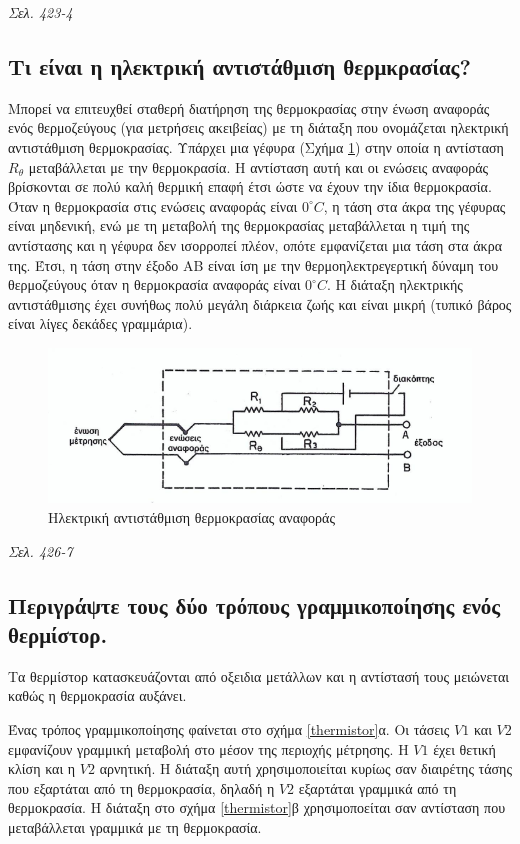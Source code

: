 \documentclass{article}
\begin{document}
\emph{Σελ. 423-4}

\subsection{Τι είναι η ηλεκτρική αντιστάθμιση θερμκρασίας?}
Μπορεί να επιτευχθεί σταθερή διατήρηση της θερμοκρασίας στην ένωση αναφοράς ενός θερμοζεύγους (για μετρήσεις ακειβείας) με τη διάταξη που ονομάζεται ηλεκτρική αντιστάθμιση
θερμοκρασίας. Υπάρχει μια γέφυρα (Σχήμα \ref{antistathmisithermokrasias}) στην οποία η αντίσταση $R_\theta$ μεταβάλλεται με την θερμοκρασία. Η αντίσταση αυτή και οι ενώσεις αναφοράς βρίσκονται σε πολύ
καλή θερμική επαφή έτσι ώστε να έχουν την ίδια θερμοκρασία. Όταν η θερμοκρασία στις ενώσεις αναφοράς είναι $0^\circ C$, η τάση στα άκρα της γέφυρας είναι μηδενική, ενώ
με τη μεταβολή της θερμοκρασίας μεταβάλλεται η τιμή της αντίστασης και η γέφυρα δεν ισορροπεί πλέον, οπότε εμφανίζεται μια τάση στα άκρα της. Έτσι, η τάση στην έξοδο ΑΒ
είναι ίση με την θερμοηλεκτρεγερτική δύναμη του θερμοζεύγους όταν η θερμοκρασία αναφοράς είναι $0^\circ C$. Η διάταξη ηλεκτρικής αντιστάθμισης έχει συνήθως πολύ μεγάλη
διάρκεια ζωής και είναι μικρή (τυπικό βάρος είναι λίγες δεκάδες γραμμάρια).

\begin{figure}[h!]
    \includegraphics[width=\linewidth]{antistathmisithermokrasias.png}
    \caption{Ηλεκτρική αντιστάθμιση θερμοκρασίας αναφοράς}
    \label{antistathmisithermokrasias}
\end{figure}

\emph{Σελ. 426-7}
\subsection{Περιγράψτε τους δύο τρόπους γραμμικοποίησης ενός θερμίστορ.}
Τα θερμίστορ κατασκευάζονται από οξειδια μετάλλων και η αντίστασή τους μειώνεται καθώς η θερμοκρασία αυξάνει. 

Ένας τρόπος γραμμικοποίησης φαίνεται στο σχήμα \ref{thermistor}α. Οι τάσεις $V1$ και $V2$ εμφανίζουν γραμμική μεταβολή στο μέσον της περιοχής μέτρησης. Η $V1$ έχει 
θετική κλίση και η $V2$ αρνητική. Η διάταξη αυτή χρησιμοποιείται κυρίως σαν διαιρέτης τάσης που εξαρτάται από τη θερμοκρασία, δηλαδή η $V2$ εξαρτάται γραμμικά από 
τη θερμοκρασία. Η διάταξη στο σχήμα \ref{thermistor}β χρησιμοποείται σαν αντίσταση που μεταβάλλεται γραμμικά με τη θερμοκρασία.
\end{document}
